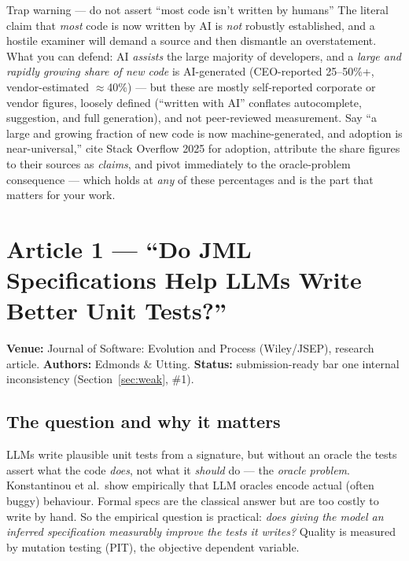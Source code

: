 \documentclass[11pt]{article}
\begin{document}
\begin{redflagbox}{Trap warning --- do not assert ``most code isn't written by humans''}
The literal claim that \emph{most} code is now written by AI is \emph{not}
robustly established, and a hostile examiner will demand a source and then
dismantle an overstatement. What you can defend: AI \emph{assists} the large
majority of developers, and a \emph{large and rapidly growing share of new
code} is AI-generated (CEO-reported 25--50\%+, vendor-estimated $\approx$40\%) ---
but these are mostly self-reported corporate or vendor figures, loosely defined
(``written with AI'' conflates autocomplete, suggestion, and full generation),
and not peer-reviewed measurement. Say ``a large and growing fraction of new
code is now machine-generated, and adoption is near-universal,'' cite Stack
Overflow 2025 for adoption, attribute the share figures to their sources as
\emph{claims}, and pivot immediately to the oracle-problem consequence --- which
holds at \emph{any} of these percentages and is the part that matters for your
work.
\end{redflagbox}

\section{Article 1 --- ``Do JML Specifications Help LLMs Write Better Unit Tests?''}
\label{sec:a1}

\textbf{Venue:} Journal of Software: Evolution and Process (Wiley/JSEP),
research article. \textbf{Authors:} Edmonds \& Utting. \textbf{Status:}
submission-ready bar one internal inconsistency (Section~\ref{sec:weak}, \#1).

\subsection{The question and why it matters}

LLMs write plausible unit tests from a signature, but without an oracle the
tests assert what the code \emph{does}, not what it \emph{should} do --- the
\emph{oracle problem}. Konstantinou et al.\ show empirically that LLM oracles
encode actual (often buggy) behaviour. Formal specs are the classical answer
but are too costly to write by hand. So the empirical question is practical:
\emph{does giving the model an inferred specification measurably improve the
tests it writes?} Quality is measured by mutation testing (PIT), the objective
dependent variable.
\end{document}
